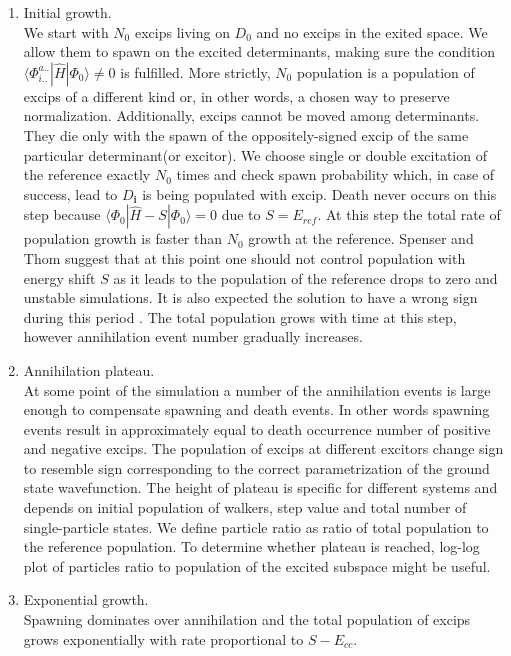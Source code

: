 \documentclass[twoside,english]{uiofysmaster}
\begin{document}
\begin{enumerate}
	\item Initial growth.\\ 
	We start with $N_0$ excips living on $D_0$ and no excips in the exited space. We allow them to spawn on the excited determinants, making sure the condition $\langle \Phi_{i..}^{a..}|\hat{H}|\Phi_0\rangle \neq 0$ is fulfilled. More strictly, $N_0$ population is a population of excips of a different kind or, in other words, a chosen way to preserve normalization. Additionally, excips cannot be moved among determinants. They die only with the spawn of the oppositely-signed excip of the same particular determinant(or excitor). We choose single or double excitation of the reference exactly $N_0$ times and check spawn probability which, in case of success, lead to $D_{\boldsymbol{i}}$ is being populated with excip. 
	Death never occurs on this step because $\langle \Phi_0|\hat{H} -S|\Phi_0\rangle = 0$ due to $S=E_{ref}$.
	At this step the total rate of population growth is faster than $N_0$ growth at the reference.
	Spenser and Thom\cite{SpencerDevelopmentsstochasticcoupled2016} suggest that at this point one should not control population with energy shift $S$ as it leads to the population of the reference drops to zero and unstable simulations. It is also expected the solution to have a wrong sign during this period \cite{Spencersignproblempopulation2012} \cite{SpencerDevelopmentsstochasticcoupled2016}.
	The total population grows with time at this step, however annihilation event number gradually increases.
	\item Annihilation plateau.\\
	At some point of the simulation a number of the annihilation events is large enough to compensate spawning and death events. In other words spawning events result in approximately equal to death occurrence number of positive and negative excips. The population of excips at different excitors change sign to resemble sign corresponding to the correct parametrization of the ground state wavefunction. 
	The height of plateau is specific for different systems and depends on initial population of walkers, step value and total number of single-particle states. We define particle ratio as ratio of total population to the reference population. To determine whether plateau is reached, log-log plot of particles ratio to population of the excited subspace might be useful.
	\item Exponential growth.\\
	Spawning dominates over annihilation and the total population of excips grows exponentially with rate proportional to $S - E_{cc}$.
\end{enumerate}
\end{document}
